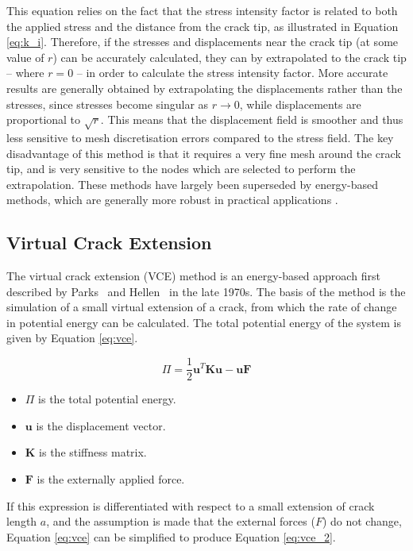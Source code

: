 This equation relies on the fact that the stress intensity factor is related to both the applied stress and the distance from the crack tip, as illustrated in Equation \ref{eq:k_i}. Therefore, if the stresses and displacements near the crack tip (at some value of $r$) can be accurately calculated, they can by extrapolated to the crack tip -- where $r=0$ -- in order to calculate the stress intensity factor. More accurate results are generally obtained by extrapolating the displacements rather than the stresses, since stresses become singular as $r\rightarrow0$, while displacements are proportional to $\sqrt{r}$. This means that the displacement field is smoother and thus less sensitive to mesh discretisation errors compared to the stress field. The key disadvantage of this method is that it requires a very fine mesh around the crack tip, and is very sensitive to the nodes which are selected to perform the extrapolation. These methods have largely been superseded by energy-based methods, which are generally more robust in practical applications \cite{anderson_fracture_2017}.

\subsection{Virtual Crack Extension}\label{sec:vce}
    
The virtual crack extension (VCE) method is an energy-based approach first described by Parks\ \cite{parks_virtual_1977} and Hellen\ \cite{hellen_method_1975} in the late 1970s. The basis of the method is the simulation of a small virtual extension of a crack, from which the rate of change in potential energy can be calculated. The total potential energy of the system is given by Equation \ref{eq:vce}.

\begin{equation}
    \Pi = \frac{1}{2} \textbf{u}^T \textbf{K} \textbf{u} - \textbf{u} \textbf{F}
    \label{eq:vce}
\end{equation}

\begin{itemize}
	\item $\Pi$ is the total potential energy.
	\item $\textbf{u}$ is the displacement vector.
	\item $\textbf{K}$ is the stiffness matrix.
	\item $\textbf{F}$ is the externally applied force.
\end{itemize}

If this expression is differentiated with respect to a small extension of crack length $a$, and the assumption is made that the external forces (\textbf{$F$}) do not change, Equation \ref{eq:vce} can be simplified to produce Equation \ref{eq:vce_2}.

